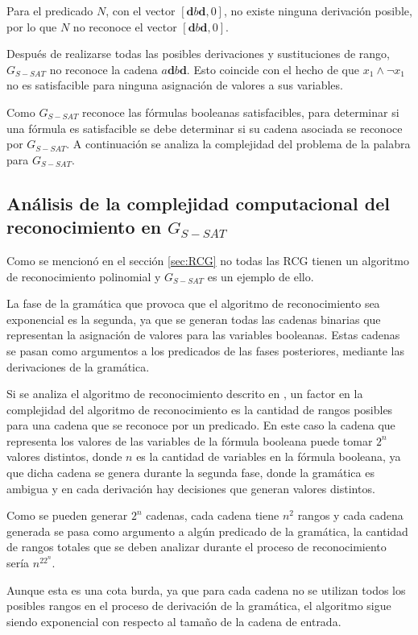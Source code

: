 \documentclass{article}
\begin{document}
Para el predicado $N$, con el vector $[\mathbf{d}b\mathbf{d},0]$, no existe ninguna derivación posible, por lo que
$N$ no reconoce el vector $[\mathbf{d}b\mathbf{d},0]$.

Después de realizarse todas las posibles derivaciones y sustituciones de rango, $G_{S-SAT}$ no reconoce la cadena
$a\mathbf{d}b\mathbf{d}$. Esto coincide con el hecho de que $x_1 \wedge \neg x_1$ no es satisfacible para ninguna asignación de valores a sus variables.


Como $G_{S-SAT}$ reconoce las fórmulas booleanas satisfacibles, para determinar si una fórmula es satisfacible se debe determinar si su cadena asociada se reconoce por $G_{S-SAT}$. A continuación se analiza la complejidad del problema de la palabra para $G_{S-SAT}$.

\subsection{Análisis de la complejidad computacional del reconocimiento en $G_{S-SAT}$}

Como se mencionó en el sección \ref{sec:RCG} no todas las RCG tienen un algoritmo de reconocimiento polinomial
y $G_{S-SAT}$ es un ejemplo de ello.

La fase de la gramática que provoca que el algoritmo de reconocimiento sea exponencial es la segunda, ya que  se generan
todas las cadenas binarias que representan la asignación de valores para las variables booleanas.
Estas cadenas se pasan como argumentos a los predicados de las fases posteriores, mediante las derivaciones de la gramática.

Si se analiza el algoritmo de reconocimiento descrito en \cite{mainRCGBib}, un factor en la complejidad del
algoritmo de reconocimiento es la cantidad de rangos posibles para una cadena que se reconoce por un predicado.
En este caso la cadena que representa los valores de las variables de la fórmula booleana puede tomar $2^n$
valores distintos, donde $n$ es la cantidad de variables en la fórmula booleana, ya que dicha cadena se genera
durante la segunda fase, donde la gramática es ambigua y en cada derivación hay decisiones que generan valores
distintos.

Como se pueden generar $2^n$ cadenas, cada cadena tiene $n^2$ rangos y cada cadena generada se pasa como
argumento a algún predicado de la gramática, la cantidad de rangos totales que se deben analizar durante
el proceso de reconocimiento sería $n^22^n$.

Aunque esta es una cota burda, ya que para cada cadena no se utilizan todos los posibles rangos en el proceso de derivación de la gramática, el algoritmo sigue siendo exponencial con respecto al tamaño de la cadena de entrada.
\end{document}
